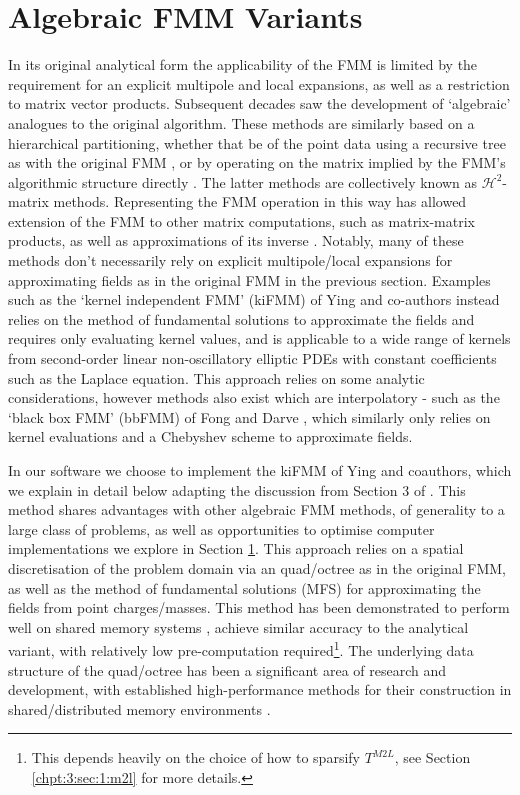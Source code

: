 \section{Algebraic FMM Variants}\label{chpt:2:sec:1}

In its original analytical form the applicability of the FMM is limited by the requirement for an explicit multipole and local expansions, as well as a restriction to matrix vector products. Subsequent decades saw the development of `algebraic' analogues to the original algorithm. These methods are similarly based on a hierarchical partitioning, whether that be of the point data using a recursive tree as with the original FMM \cite{Ying:2004:JCP,fong2009black}, or by operating on the matrix implied by the FMM's algorithmic structure directly \cite{hackbusch1999sparse,borm2003introduction,chandrasekaran2007fast}. The latter methods are collectively known as $\mathcal{H}^2$-matrix methods. Representing the FMM operation in this way has allowed extension of the FMM to other matrix computations, such as matrix-matrix products, as well as approximations of its inverse \cite{ambikasaran2014inverse}. Notably, many of these methods don't necessarily rely on explicit multipole/local expansions for approximating fields as in the original FMM in the previous section. Examples such as the `kernel independent FMM' (kiFMM) of Ying and co-authors instead relies on the method of fundamental solutions to approximate the fields and requires only evaluating kernel values, and is applicable to a wide range of kernels from second-order linear non-oscillatory elliptic PDEs with constant coefficients such as the Laplace equation. This approach relies on some analytic considerations, however methods also exist which are interpolatory - such as the `black box FMM' (bbFMM) of Fong and Darve \cite{fong2009black}, which similarly only relies on kernel evaluations and a Chebyshev scheme to approximate fields.

In our software we choose to implement the kiFMM of Ying and coauthors, which we explain in detail below adapting the discussion from Section 3 of \cite{Ying:2004:JCP}. This method shares advantages with other algebraic FMM methods, of generality to a large class of problems, as well as opportunities to optimise computer implementations we explore in Section \ref{chpt:2:sec:1}. This approach relies on a spatial discretisation of the problem domain via an quad/octree as in the original FMM, as well as the method of fundamental solutions (MFS) for approximating the fields from point charges/masses. This method has been demonstrated to perform well on shared memory systems \cite{wang2021exafmm}, achieve similar accuracy to the analytical variant, with relatively low pre-computation required\footnote{This depends heavily on the choice of how to sparsify $T^{M2L}$, see Section \ref{chpt:3:sec:1:m2l} for more details.}. The underlying data structure of the quad/octree has been a significant area of research and development, with established high-performance methods for their construction in shared/distributed memory environments \cite{sundar2008bottom,sundar2013hyksort,BursteddeWilcoxGhattas11}.

